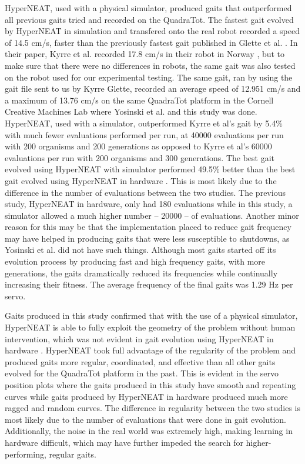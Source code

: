 HyperNEAT, used with a physical simulator, produced gaits that outperformed all previous gaits tried and recorded on the QuadraTot. 
The fastest gait evolved by HyperNEAT in simulation and transfered onto the real robot recorded a speed of 14.5 cm/s, faster than the previously fastest gait published in Glette et al. \cite{glette}. 
In their paper, Kyrre et al. \cite{glette} recorded 17.8 cm/s in their robot in Norway \cite{glette}, but to make sure that there were no differences in robots, the same gait was also tested on the robot used for our experimental testing.
The same gait, ran by using the gait file sent to us by Kyrre Glette, recorded an average speed of 12.951 cm/s and a maximum of 13.76 cm/s on the same QuadraTot platform in the Cornell Creative Machines Lab where Yosinski et al. \cite{yos:clune} and this study was done.
HyperNEAT, used with a simulator, outperformed Kyrre et al's \cite{glette} gait by 5.4\% with much fewer evaluations performed per run, at 40000 evaluations per run with 200 organisms and 200 generations as opposed to Kyrre et al's \cite{glette} 60000 evaluations per run with 200 organisms and 300 generations.
The best gait evolved using HyperNEAT with simulator performed 49.5\% better than the best gait evolved using HyperNEAT in hardware \cite{yos:clune}. 
This is most likely due to the difference in the number of evaluations between the two studies. 
The previous study, HyperNEAT in hardware, only had 180 evaluations while in this study, a simulator allowed a much higher number -- 20000 -- of evaluations. 
Another minor reason for this may be that the implementation placed to reduce gait frequency may have helped in producing gaits that were less susceptible to shutdowns, as Yosinski et al. \cite{yos:clune} did not have such things.
Although most gaits started off its evolution process by producing fast and high frequency gaits, with more generations, the gaits dramatically reduced its frequencies while continually increasing their fitness. The average frequency of the final gaits was 1.29 Hz per servo. 

Gaits produced in this study confirmed that with the use of a physical simulator, HyperNEAT is able to fully exploit the geometry of the problem without human intervention, which was not evident in gait evolution using HyperNEAT in hardware \cite{yos:clune}. 
HyperNEAT took full advantage of the regularity of the problem and produced gaits more regular, coordinated, and effective than all other gaits evolved for the QuadraTot platform in the past.
This is evident in the servo position plots where the gaits produced in this study have smooth and repeating curves while gaits produced by HyperNEAT in hardware produced much more ragged and random curves.
The difference in regularity between the two studies is most likely due to the number of evaluations that were done in gait evolution. Additionally, the noise in the real world was extremely high, making learning in hardware difficult, which may have further impeded the search for higher-performing, regular gaits.

